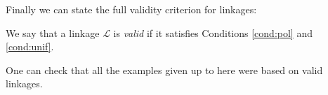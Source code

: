 Finally we can state the full validity criterion for linkages:

\begin{definition}
  We say that a linkage $\mathcal{L}$ is \emph{valid} if it satisfies Conditions
  \ref{cond:pol} and \ref{cond:unif}.
\end{definition}

One can check that all the examples given up to here were based on valid
linkages.






